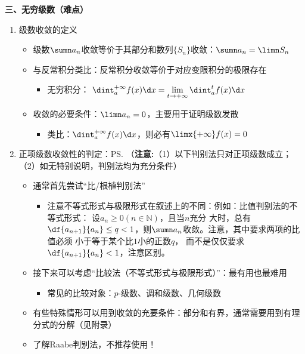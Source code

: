 {\bf 三、无穷级数（难点）}
\begin{enumerate}
  \item 级数收敛的定义
  \begin{itemize}
    \item 级数$\sumn a_n$收敛等价于其部分和数列$\{S_n\}$收敛：$\sumn a_n=\limn S_n$
    \item 与反常积分类比：反常积分收敛等价于对应变限积分的极限存在
    \begin{itemize}
      \item 无穷积分：
      $\dint_a^{+\infty}f(x)\d x=\lim\limits_{t\to+\infty}\dint_a^tf(x)\d x$
    \end{itemize}
    \item 收敛的必要条件：$\limn a_n=0$，主要用于证明级数发散
    \begin{itemize}
      \item 类比：$\dint_a^{+\infty}f(x)\d x$，则必有$\limx{+\infty}f(x)=0$
    \end{itemize}
  \end{itemize} 
  \item 正项级数收敛性的判定：\ps{（{\bf 注意:}（1）以下判别法只对正项级数成立；
  （2）如无特别说明，判别法均为充分条件）}
  \begin{itemize}
    \item 通常首先尝试“比/根植判别法”
    \begin{itemize}
      \item 注意不等式形式与极限形式在叙述上的不同：例如：比值判别法的不等式形式：
      设$a_n\geq 0(n\in\mathbb{N})$，且当$n$充分 大时，总有$\df{a_{n+1}}{a_n}\leq
      q<1$，则$\sumn a_n$收敛。注意，其中要求两项的比值必须 小于等于某个比$1$小的正数$q$，
      而不是仅仅要求$\df{a_{n+1}}{a_n}<1$，注意区别。
    \end{itemize}
    \item 接下来可以考虑“比较法（不等式形式与极限形式）”：最有用也最难用
    \begin{itemize}
      \item 常见的比较对象：$p$-级数、调和级数、几何级数
    \end{itemize}
    \item 有些特殊情形可以用到收敛的充要条件：部分和有界，通常需要用到有理分式的分解（见附录）
    \item 了解Raabe判别法，不推荐使用！
  \end{itemize}

\end{enumerate}
